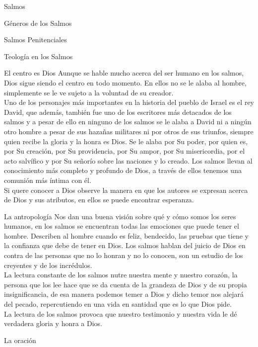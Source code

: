 \begin{section}{Salmos}
\begin{subsection}{Géneros de los Salmos}
\begin{subsubsection}{Salmos Penitenciales}
		\end{subsubsection}
	\end{subsection}
	\newpage
	\begin{subsection}{Teología en los Salmos}
		\begin{subsubsection}{El centro es Dios}
			Aunque se hable mucho acerca del ser humano en los salmos, Dios sigue siendo el centro en todo momento. En ellos no se le alaba al hombre, simplemente se le ve sujeto a la voluntad de su creador.\\
			Uno de los personajes más importantes en la historia del pueblo de Israel es el rey David, que además, también fue uno de los escritores más detacados de los salmos y a pesar de ello en ninguno de los salmos se le alaba a David ni a ningún otro hombre a pesar de sus hazañas militares ni por otros de sus triunfos, siempre quien recibe la gloria y la honra es Dios. Se le alaba por Su poder, por quien es, por Su creación, por Su providencia, por Su ampor, por Su misericordia, por el acto salvífico y por Su señorío sobre las naciones y lo creado. Los salmos llevan al conocimiento más completo y profundo de Dios, a través de ellos tenemos una comunión más íntima con él. \\
			Si quere conocer a Dios observe la manera en que los autores se expresan acerca de Dios y sus atributos, en ellos se puede encontrar esperanza.
		\end{subsubsection}
		\begin{subsubsection}{La antropología}
			Nos dan una buena visión sobre qué y cómo somos los seres humanos, en los salmos se encuentran todas las emociones que puede tener el hombre. Describen al hombre cuando es feliz, bendecido, las pruebas que tiene y la confianza que debe de tener en Dios. Los salmos hablan del juicio de Dios en contra de las personas que no lo honran y no lo conocen, son un estudio de los creyentes y de los incrédulos. \\
			La lectura constante de los salmos nutre nuestra mente y nuestro corazón, la persona que los lee hace que se da cuenta de la grandeza de Dios y de su propia insignificancia, de esa manera podemos temer a Dios y dicho temor nos alejará del pecado, repercutiendo en una vida en santidad que es lo que Dios pide.\\
			La lectura de los salmos provoca que nuestro testimonio y nuestra vida le dé verdadera gloria y honra a Dios.
		\end{subsubsection}
		\begin{subsubsection}{La oración}

\end{subsubsection}
\end{subsection}
\end{section}

